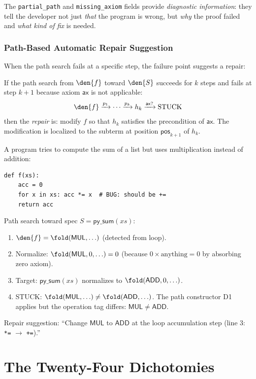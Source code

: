 The \texttt{partial\_path} and \texttt{missing\_axiom} fields provide
\emph{diagnostic information}: they tell the developer not just
\emph{that} the program is wrong, but \emph{why} the proof failed
and \emph{what kind of fix} is needed.

\section{Path-Based Automatic Repair Suggestion}

When the path search fails at a specific step, the failure point
suggests a repair:

\begin{theorem}
\label{thm:repair-from-path}
If the path search from $\den{f}$ toward $\den{S}$ succeeds for
$k$ steps and fails at step $k+1$ because axiom $\mathsf{ax}$ is
not applicable:
\[
  \den{f} \xrightarrow{p_1} \cdots \xrightarrow{p_k} h_k
  \xrightarrow{\mathsf{ax}?} \text{STUCK}
\]
then the \emph{repair} is: modify $f$ so that $h_k$ satisfies the
precondition of $\mathsf{ax}$.  The modification is localized to
the subterm at position $\mathsf{pos}_{k+1}$ of $h_k$.
\end{theorem}

\begin{example}
A program tries to compute the sum of a list but uses multiplication
instead of addition:
\begin{lstlisting}
def f(xs):
    acc = 0
    for x in xs: acc *= x  # BUG: should be +=
    return acc
\end{lstlisting}

Path search toward spec $S = \mathsf{py\_sum}(xs)$:
\begin{enumerate}
  \item $\den{f} = \fold(\mathsf{MUL}, \ldots)$ (detected from loop).
  \item Normalize: $\fold(\mathsf{MUL}, 0, \ldots) = 0$ (because
    $0 \times \text{anything} = 0$ by absorbing zero axiom).
  \item Target: $\mathsf{py\_sum}(xs)$ normalizes to
    $\fold(\mathsf{ADD}, 0, \ldots)$.
  \item STUCK: $\fold(\mathsf{MUL}, \ldots) \neq \fold(\mathsf{ADD}, \ldots)$.
    The path constructor D1 applies but the operation tag differs:
    $\mathsf{MUL} \neq \mathsf{ADD}$.
\end{enumerate}

Repair suggestion: ``Change $\mathsf{MUL}$ to $\mathsf{ADD}$ at
the loop accumulation step (line 3: \texttt{*=} $\to$ \texttt{+=}).''
\end{example}


\part{The Twenty-Four Dichotomies}

